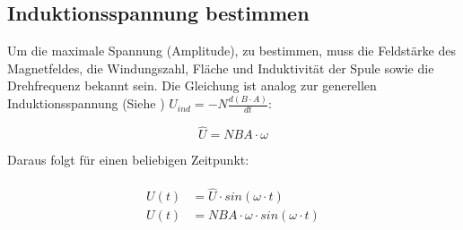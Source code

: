 \subsection{Induktionsspannung bestimmen}

Um die maximale Spannung (Amplitude), zu bestimmen, muss die Feldstärke des Magnetfeldes, die Windungszahl, Fläche und Induktivität der Spule sowie die Drehfrequenz bekannt sein. Die Gleichung ist analog zur generellen Induktionsspannung (Siehe ) $U_{ind} = -N \frac{d(B \cdot A)}{dt}$:

\begin{equation}	\label{eq:hatU}
	\hat{U} = NBA \cdot \omega
\end{equation}

\noindent Daraus folgt für einen beliebigen Zeitpunkt:

\begin{align}		\label{eq:hatUbeliebig}
\begin{split}
	U(t) &= \hat{U} \cdot sin(\omega \cdot t) \\
	U(t) &= NBA \cdot \omega \cdot sin(\omega \cdot t)
\end{split}
\end{align}



